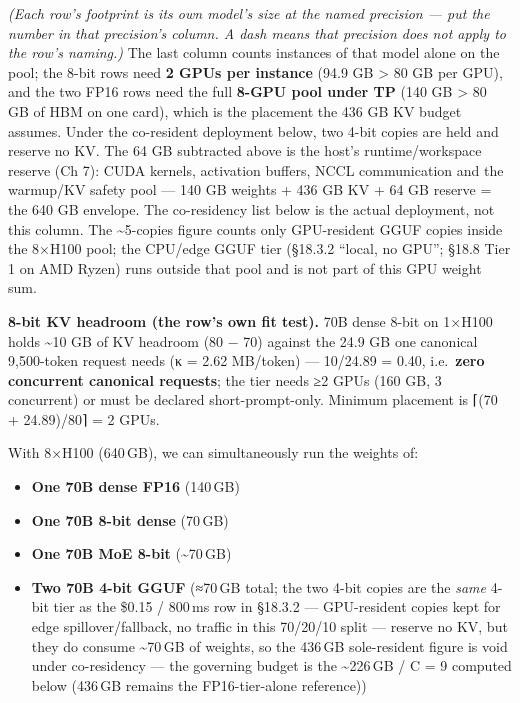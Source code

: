 \emph{(Each row's footprint is its own model's size at the named
precision --- put the number in that precision's column. A dash means
that precision does not apply to the row's naming.)} The last column
counts instances of that model alone on the pool; the 8-bit rows need
\textbf{2 GPUs per instance} (94.9 GB \textgreater{} 80 GB per GPU), and
the two FP16 rows need the full \textbf{8-GPU pool under TP} (140 GB
\textgreater{} 80 GB of HBM on one card), which is the placement the 436
GB KV budget assumes. Under the co-resident deployment below, two 4-bit
copies are held and reserve no KV. The 64 GB subtracted above is the
host's runtime/workspace reserve (Ch 7): CUDA kernels, activation
buffers, NCCL communication and the warmup/KV safety pool --- 140 GB
weights + 436 GB KV + 64 GB reserve = the 640 GB envelope. The
co-residency list below is the actual deployment, not this column. The
\textasciitilde5-copies figure counts only GPU-resident GGUF copies
inside the 8×H100 pool; the CPU/edge GGUF tier (§18.3.2 ``local, no
GPU''; §18.8 Tier 1 on AMD Ryzen) runs outside that pool and is not part
of this GPU weight sum.

\textbf{8-bit KV headroom (the row's own fit test).} 70B dense 8-bit on
1×H100 holds \textasciitilde10 GB of KV headroom (80 − 70) against the
24.9 GB one canonical 9,500-token request needs (κ = 2.62 MB/token) ---
10/24.89 = 0.40, i.e.~\textbf{zero concurrent canonical requests}; the
tier needs ≥2 GPUs (160 GB, 3 concurrent) or must be declared
short-prompt-only. Minimum placement is ⌈(70 + 24.89)/80⌉ = 2 GPUs.


With 8×H100 (640\,GB), we can simultaneously run the weights of:

\begin{itemize}
\tightlist
\item
  \textbf{One 70B dense FP16} (140\,GB)
\item
  \textbf{One 70B 8-bit dense} (70\,GB)
\item
  \textbf{One 70B MoE 8-bit} (\textasciitilde70\,GB)
\item
  \textbf{Two 70B 4-bit GGUF} (≈70\,GB total; the two 4-bit copies are
  the \emph{same} 4-bit tier as the \$0.15 / 800\,ms row in §18.3.2 ---
  GPU-resident copies kept for edge spillover/fallback, no traffic in
  this 70/20/10 split --- reserve no KV, but they do consume
  \textasciitilde70\,GB of weights, so the 436\,GB sole-resident figure
  is void under co-residency --- the governing budget is the
  \textasciitilde226\,GB / C = 9 computed below (436\,GB remains the
  FP16-tier-alone reference))
\end{itemize}

